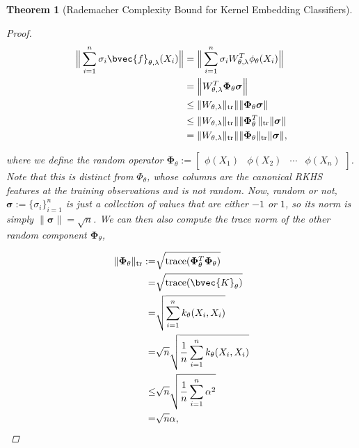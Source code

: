 \documentclass{article}
\newtheorem{theorem}{Theorem}[section]
\numberwithin{equation}{section}
\numberwithin{table}{section}
\numberwithin{algorithm}{section}
\begin{document}
\begin{theorem}[Rademacher Complexity Bound for Kernel Embedding Classifiers]
\begin{proof}
				\begin{equation}
					\begin{aligned}
						\Big\| \sum_{i = 1}^{n} \sigma_{i}\bvec{f}_{\theta, \lambda}(X_{i}) \Big\| &= \Big\| \sum_{i = 1}^{n} \sigma_{i} W_{\theta, \lambda}^{T} \phi_{\theta}(X_{i}) \Big\| \\
						&= \Big\| W_{\theta, \lambda}^{T} \bm{\Phi}_{\theta} \bm{\sigma} \Big\| \\
						&\leq \| W_{\theta, \lambda} \|_{\mathrm{tr}} \| \| \bm{\Phi}_{\theta} \bm{\sigma} \| \\
						&\leq \| W_{\theta, \lambda} \|_{\mathrm{tr}} \| \| \bm{\Phi}_{\theta}^{T} \|_{\mathrm{tr}} \| \bm{\sigma} \| \\
						&= \| W_{\theta, \lambda} \|_{\mathrm{tr}} \| \| \bm{\Phi}_{\theta} \|_{\mathrm{tr}} \| \bm{\sigma} \|,
					\end{aligned}
				\end{equation}
				
				where we define the random operator $\bm{\Phi}_{\theta} := \begin{bmatrix} \phi(X_{1}) & \phi(X_{2}) & \cdots & \phi(X_{n}) \end{bmatrix}$. Note that this is distinct from $\Phi_{\theta}$, whose columns are the canonical RKHS features at the training observations and is not random. Now, random or not, $\bm{\sigma} := \{\sigma_{i}\}_{i = 1}^{n}$ is just a collection of values that are either $-1$ or $1$, so its norm is simply $\| \bm{\sigma} \| = \sqrt{n}$. We can then also compute the trace norm of the other random component $\bm{\Phi}_{\theta}$,
				
				\begin{equation}
					\begin{aligned}
						\| \bm{\Phi}_{\theta} \|_{\mathrm{tr}} :=& \sqrt{\mathrm{trace}(\bm{\Phi}_{\theta}^{T} \bm{\Phi}_{\theta})} \\
						=& \sqrt{\mathrm{trace}(\bvec{K}_{\theta})} \\
						=& \sqrt{\sum_{i = 1}^{n} k_{\theta}(X_{i}, X_{i})} \\
						=& \sqrt{n} \sqrt{ \frac{1}{n} \sum_{i = 1}^{n} k_{\theta}(X_{i}, X_{i})} \\
						\leq& \sqrt{n} \sqrt{ \frac{1}{n} \sum_{i = 1}^{n} \alpha^{2}} \\
						=& \sqrt{n} \alpha,
					\end{aligned}
				\end{equation}
				

\end{proof}
\end{theorem}
\end{document}
